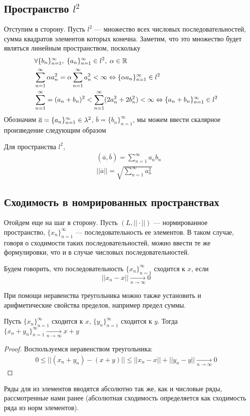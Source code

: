 \documentclass[a4paper, 12pt]{article}
\begin{document}
\subsection{Пространство $l^2$}
Отступим в сторону.
Пусть $l^2$ --- множество всех числовых последовательностей, сумма квадратов элементов которых конечна. Заметим, что это множество будет являться линейным пространством, поскольку
\begin{align*}
    &\forall \{b_n\}_{n=1}^{\infty},\; \{a_n\}_{n=1}^{\infty} \in l^2,\; \alpha \in \mathbb{R}\\
    &\sum\limits_{n=1}^{\infty} \alpha a_n^2 = \alpha \sum\limits_{n=1}^{\infty} a_n^2 < \infty \Leftrightarrow \{\alpha a_n\}_{n=1}^{\infty} \in l^2\\
    &\sum\limits_{n=1}^{\infty} = (a_n+b_n)^2< \sum\limits_{n=1}^{\infty} (2a_n^2 + 2b_n^2) < \infty \Leftrightarrow \{a_n + b_n\}_{n=1}^{\infty} \in l^2
\end{align*}
Обозначим $\overline{a} = \{a_n\}_{n=1}^{\infty}\in \lambda^2$, $\overline{b} = \{b_n\}_{n=1}^{\infty}$, мы можем ввести скалярное произведение следующим образом
\begin{Def}
    Для пространства $l^2$, 
    \begin{align*}
        &(\overline{a}, \overline{b}) = \sum\limits_{n=1}^{\infty} a_nb_n\\
        &||\overline{a}|| = \sqrt{\sum\limits_{n=1}^{\infty}a_n^2}
    \end{align*}
\end{Def}
\subsection{Сходимость в номрированных пространствах}
Отойдем еще на шаг в сторону. Пусть $(L, ||\cdot||)$ --- нормированное пространство, $\{x_n\}_{n=1}^{\infty}$ --- последовательность ее элементов. В таком случае, говоря о сходимости таких последовательностей, можно ввести те же формулировки, что и в случае числовых последовательностей.
\begin{Def}
    Будем говорить, что последовательность $\{x_n\}_{n=1}^{\infty}$ сходится к $x$, если 
    $$
        ||x_n - x|| \underset{n\to \infty}{\to} 0
    $$
\end{Def}
При помощи неравенства треугольника можно также установить и арифметические свойства пределов, например предел суммы.
\begin{Statement}
    Пусть $\{x_n\}_{n=1}^{\infty}$ сходится к $x$, $\{y_n\}_{n=1}^{\infty}$ сходится к $y$. Тогда  $\{x_n + y_n\}_{n=1}^{\infty} \underset{n\to \infty}{\to} x+y$
\end{Statement}
\begin{proof}
    Воспользуемся неравенством треугольника:
    \begin{gather*}
        0\leqslant ||(x_n + y_n) - (x + y)|| \leqslant ||x_n-x|| + ||y_n - y|| \underset{n\to\infty}{\to} 0
    \end{gather*}
\end{proof}
Ряды для из элементов вводятся абсолютно так же, как и числовые ряды, рассмотренные нами ранее (абсолютная сходимость определяется как сходимость ряда из норм элементов).
\end{document}
